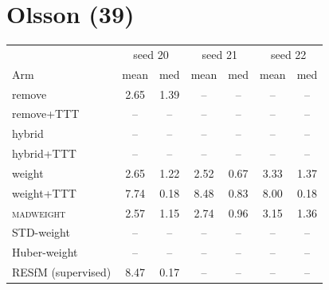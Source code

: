 \documentclass[10pt]{article}
\begin{document}
\section*{Olsson (39)}
\begin{tabular}{lcccccc}
\toprule
 & \multicolumn{2}{c}{seed 20} & \multicolumn{2}{c}{seed 21} & \multicolumn{2}{c}{seed 22}\\
Arm & mean & med & mean & med & mean & med\\
\midrule
remove & 2.65 & 1.39 & -- & -- & -- & --\\
remove+TTT & -- & -- & -- & -- & -- & --\\
hybrid & -- & -- & -- & -- & -- & --\\
hybrid+TTT & -- & -- & -- & -- & -- & --\\
weight & 2.65 & 1.22 & 2.52 & 0.67 & 3.33 & 1.37\\
weight+TTT & 7.74 & 0.18 & 8.48 & 0.83 & 8.00 & 0.18\\
\textsc{madweight} & 2.57 & 1.15 & 2.74 & 0.96 & 3.15 & 1.36\\
STD-weight & -- & -- & -- & -- & -- & --\\
Huber-weight & -- & -- & -- & -- & -- & --\\
\midrule
RESfM (supervised) & 8.47 & 0.17 & -- & -- & -- & --\\
\bottomrule
\end{tabular}
\vspace{1em}
\end{document}

